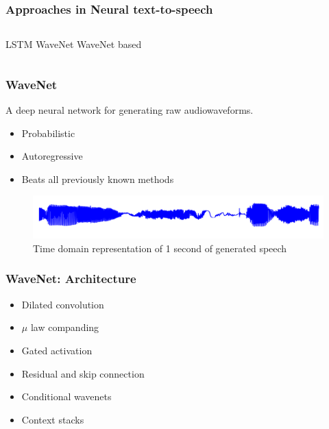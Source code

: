 \documentclass{beamer}
\begin{document}
  \begin{frame}
    \frametitle{Approaches in Neural text-to-speech}
      \begin{columns}
          LSTM
          WaveNet
          WaveNet based
      \end{columns}
  \end{frame}

  \begin{frame}
    \frametitle{WaveNet}
      A deep neural network for generating raw audiowaveforms.

      \begin{itemize}
        \item Probabilistic 
        \item Autoregressive
        \item Beats all previously known methods
      \end{itemize}
      \begin{figure}
        \centering
        \includegraphics[width=\textwidth]{images/second_of_speech.png}
        \caption{Time domain representation of 1 second of generated speech}
      \end{figure}
  \end{frame}

  \begin{frame}
    \frametitle{WaveNet: Architecture}
      \begin{itemize}
        \item Dilated convolution
        \item $\mu$ law companding
        \item Gated activation
        \item Residual and skip connection
        \item Conditional wavenets
        \item Context stacks
      \end{itemize}
  \end{frame}
\end{document}
